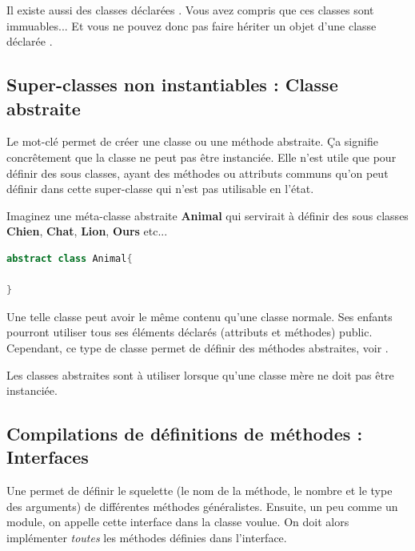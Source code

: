 \documentclass[a4paper,twoside]{article}
\begin{document}
\begin{remarque}
Il existe aussi des classes déclarées . Vous avez compris que ces classes sont immuables... Et vous ne pouvez donc pas faire hériter un objet d'une classe déclarée .
\end{remarque}

\subsection{Super-classes non instantiables : Classe abstraite}\label{sec:classe_abstraite}
Le mot-clé  permet de créer une classe ou une méthode abstraite. Ça signifie concrêtement que la classe ne peut pas être instanciée. Elle n'est utile que pour définir des sous classes, ayant des méthodes ou attributs communs qu'on peut définir dans cette super-classe qui n'est pas utilisable en l'état.
\begin{exemple}
Imaginez une méta-classe abstraite \textbf{Animal} qui servirait à définir des sous classes \textbf{Chien}, \textbf{Chat}, \textbf{Lion}, \textbf{Ours} etc...
\end{exemple}

\begin{lstlisting}[language=java]
abstract class Animal{
 
}
\end{lstlisting}

Une telle classe peut avoir le même contenu qu'une classe normale. Ses enfants pourront utiliser tous ses éléments déclarés (attributs et méthodes) public. Cependant, ce type de classe permet de définir des méthodes abstraites, voir .

\begin{remarque}
Les classes abstraites sont à utiliser lorsque qu'une classe mère ne doit pas être instanciée.
\end{remarque}

\subsection{Compilations de définitions de méthodes : Interfaces}\label{sec:interface}
Une  permet de définir le squelette (le nom de la méthode, le nombre et le type des arguments) de différentes méthodes généralistes. Ensuite, un peu comme un module, on appelle cette interface dans la classe voulue. On doit alors implémenter \textit{toutes} les méthodes définies dans l'interface.
\end{document}
